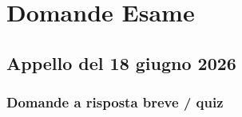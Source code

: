 	\section{Domande Esame}
	
	\subsection{Appello del 18 giugno 2026}
	
	\subsubsection{Domande a risposta breve / quiz}
	
